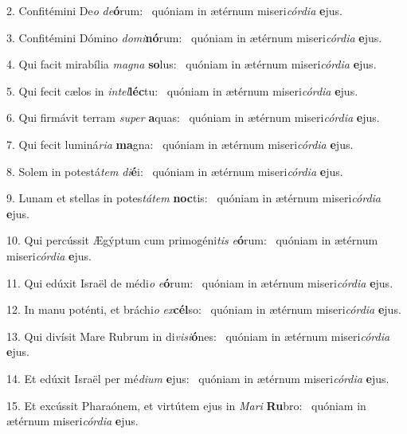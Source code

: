 2. Confitémini De\textit{o} \textit{de}\textbf{ó}rum: \ast\  quóniam in ætérnum miseri\textit{cór}\textit{di}\textit{a} \textbf{e}jus.\

3. Confitémini Dómino \textit{do}\textit{mi}\textbf{nó}rum: \ast\  quóniam in ætérnum miseri\textit{cór}\textit{di}\textit{a} \textbf{e}jus.\

4. Qui facit mirabília \textit{ma}\textit{gna} \textbf{so}lus: \ast\  quóniam in ætérnum miseri\textit{cór}\textit{di}\textit{a} \textbf{e}jus.\

5. Qui fecit cælos in \textit{in}\textit{tel}\textbf{léc}tu: \ast\  quóniam in ætérnum miseri\textit{cór}\textit{di}\textit{a} \textbf{e}jus.\

6. Qui firmávit terram \textit{su}\textit{per} \textbf{a}quas: \ast\  quóniam in ætérnum miseri\textit{cór}\textit{di}\textit{a} \textbf{e}jus.\

7. Qui fecit luminá\textit{ri}\textit{a} \textbf{ma}gna: \ast\  quóniam in ætérnum miseri\textit{cór}\textit{di}\textit{a} \textbf{e}jus.\

8. Solem in potestá\textit{tem} \textit{di}\textbf{é}i: \ast\  quóniam in ætérnum miseri\textit{cór}\textit{di}\textit{a} \textbf{e}jus.\

9. Lunam et stellas in potes\textit{tá}\textit{tem} \textbf{noc}tis: \ast\  quóniam in ætérnum miseri\textit{cór}\textit{di}\textit{a} \textbf{e}jus.\

10. Qui percússit Ægýptum cum primogéni\textit{tis} \textit{e}\textbf{ó}rum: \ast\  quóniam in ætérnum miseri\textit{cór}\textit{di}\textit{a} \textbf{e}jus.\

11. Qui edúxit Israël de médi\textit{o} \textit{e}\textbf{ó}rum: \ast\  quóniam in ætérnum miseri\textit{cór}\textit{di}\textit{a} \textbf{e}jus.\

12. In manu poténti, et bráchi\textit{o} \textit{ex}\textbf{cél}so: \ast\  quóniam in ætérnum miseri\textit{cór}\textit{di}\textit{a} \textbf{e}jus.\

13. Qui divísit Mare Rubrum in di\textit{vi}\textit{si}\textbf{ó}nes: \ast\  quóniam in ætérnum miseri\textit{cór}\textit{di}\textit{a} \textbf{e}jus.\

14. Et edúxit Israël per mé\textit{di}\textit{um} \textbf{e}jus: \ast\  quóniam in ætérnum miseri\textit{cór}\textit{di}\textit{a} \textbf{e}jus.\

15. Et excússit Pharaónem, et virtútem ejus in \textit{Ma}\textit{ri} \textbf{Ru}bro: \ast\  quóniam in ætérnum miseri\textit{cór}\textit{di}\textit{a} \textbf{e}jus.\

